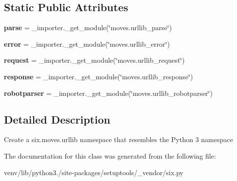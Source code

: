 \subsection*{Static Public Attributes}
\begin{DoxyCompactItemize}
\item 
\mbox{\label{classsetuptools_1_1__vendor_1_1six_1_1_module__six__moves__urllib_a78390000c1b62c99da4c487f3d3b8cff}} 
{\bfseries parse} = \+\_\+importer.\+\_\+get\+\_\+module(\char`\"{}moves.\+urllib\+\_\+parse\char`\"{})
\item 
\mbox{\label{classsetuptools_1_1__vendor_1_1six_1_1_module__six__moves__urllib_a99591eace9a380728ded4b959a913a45}} 
{\bfseries error} = \+\_\+importer.\+\_\+get\+\_\+module(\char`\"{}moves.\+urllib\+\_\+error\char`\"{})
\item 
\mbox{\label{classsetuptools_1_1__vendor_1_1six_1_1_module__six__moves__urllib_a5d55233c74674864e25f0a48b2ccb6a9}} 
{\bfseries request} = \+\_\+importer.\+\_\+get\+\_\+module(\char`\"{}moves.\+urllib\+\_\+request\char`\"{})
\item 
\mbox{\label{classsetuptools_1_1__vendor_1_1six_1_1_module__six__moves__urllib_a30f5c67d654556e29dfd54b7c6e4d9ac}} 
{\bfseries response} = \+\_\+importer.\+\_\+get\+\_\+module(\char`\"{}moves.\+urllib\+\_\+response\char`\"{})
\item 
\mbox{\label{classsetuptools_1_1__vendor_1_1six_1_1_module__six__moves__urllib_a800ab41feec2003c83972819bde45118}} 
{\bfseries robotparser} = \+\_\+importer.\+\_\+get\+\_\+module(\char`\"{}moves.\+urllib\+\_\+robotparser\char`\"{})
\end{DoxyCompactItemize}


\subsection{Detailed Description}
\begin{DoxyVerb}Create a six.moves.urllib namespace that resembles the Python 3 namespace\end{DoxyVerb}
 

The documentation for this class was generated from the following file\+:\begin{DoxyCompactItemize}
\item 
venv/lib/python3./site-\/packages/setuptools/\+\_\+vendor/six.\+py\end{DoxyCompactItemize}
